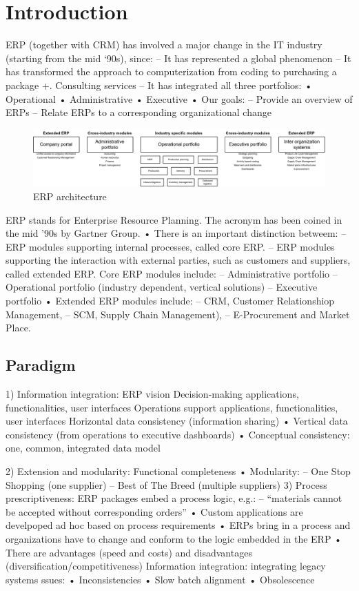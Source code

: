 \section{Introduction}

ERP (together with CRM) has involved a major change in the IT industry (starting from
the mid ‘90s), since:
– It has represented a global phenomenon
– It has transformed the approach to computerization from coding to purchasing a package +.
Consulting services
– It has integrated all three portfolios:
• Operational
• Administrative
• Executive
• Our goals:
– Provide an overview of ERPs
– Relate ERPs to a corresponding organizational change
\begin{figure}[H]
    \centering
    \includegraphics[width=1\linewidth]{images/bis1.png}
    \caption{ERP architecture}
\end{figure}
ERP stands for Enterprise Resource Planning. The acronym has been
coined in the mid ’90s by Gartner Group.
• There is an important distinction betweem:
– ERP modules supporting internal processes, called core ERP.
– ERP modules supporting the interaction with external parties, such as customers
and suppliers, called extended ERP.
Core ERP modules include: – Administrative portfolio
– Operational portfolio (industry dependent, vertical solutions)
– Executive portfolio
• Extended ERP modules include: – CRM, Customer Relationshiop Management,
– SCM, Supply Chain Management),
– E-Procurement and Market Place.

\subsection{Paradigm}
1) Information integration: ERP vision Decision-making applications, functionalities, user interfaces Operations support applications, functionalities, user interfaces Horizontal data consistency (information sharing)
• Vertical data consistency (from operations to executive dashboards)
• Conceptual consistency: one, common, integrated data model

2) Extension and modularity: Functional completeness
• Modularity:
– One Stop Shopping (one
supplier)
– Best of The Breed (multiple
suppliers)
3) Process prescriptiveness: ERP packages embed a process logic, e.g.: – “materials cannot be accepted without corresponding orders”
• Custom applications are develpoped ad hoc based on process requirements
• ERPs bring in a process and organizations have to change and conform to the logic
embedded in the ERP
• There are advantages (speed and costs) and disadvantages
(diversification/competitiveness)
Information integration: integrating legacy systems
ssues:
• Inconsistencies
• Slow batch alignment
• Obsolescence

